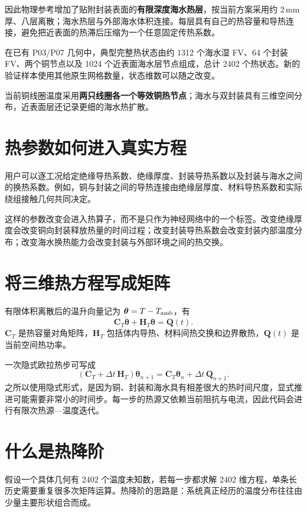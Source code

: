 因此物理参考增加了贴附封装表面的\textbf{有限深度海水热层}，按当前方案采用约 2\,mm 厚、八层离散；海水热层与外部海水体积连接。每层具有自己的热容量和导热连接，避免把近表面的热滞后压缩为一个任意固定传热系数。

在已有 P03/P07 几何中，典型完整热状态由约 1312 个海水湿 FV、64 个封装 FV、两个铜节点以及 1024 个近表面海水层节点组成，总计 2402 个热状态。新的验证样本使用其他原生网格数量，状态维数可以随之改变。

当前铜线圈温度采用\textbf{两只线圈各一个等效铜热节点}；海水与双封装具有三维空间分布，近表面层还记录更细的海水热扩散。

\section{热参数如何进入真实方程}
用户可以逐工况给定绝缘导热系数、绝缘厚度、封装导热系数以及封装与海水之间的换热系数。例如，铜与封装之间的导热连接由绝缘层厚度、材料导热系数和实际绕组接触几何共同决定。

这样的参数改变会进入热算子，而不是只作为神经网络中的一个标签。改变绝缘厚度会改变铜向封装释放热量的时间过程；改变封装导热系数会改变封装内部温度分布；改变海水换热能力会改变封装与外部环境之间的热交换。

\section{将三维热方程写成矩阵}
有限体积离散后的温升向量记为
$\boldsymbol\theta=T-T_{\rm amb}$，有
\begin{equation}
\label{eq:fullheat}
\mathbf C_T\dot{\boldsymbol\theta}
+\mathbf H_T\boldsymbol\theta
=\mathbf Q(t).
\end{equation}
$\mathbf C_T$ 是热容量对角矩阵，$\mathbf H_T$ 包括体内导热、材料间热交换和边界散热，$\mathbf Q(t)$ 是当前空间热功率。

一次隐式欧拉热步可写成
\begin{equation}
\label{eq:implicit}
(\mathbf C_T+\Delta t\,\mathbf H_T)
\boldsymbol\theta_{n+1}
=\mathbf C_T\boldsymbol\theta_n+\Delta t\,\mathbf Q_{n+1}.
\end{equation}
之所以使用隐式形式，是因为铜、封装和海水具有相差很大的热时间尺度，显式推进可能需要非常小的时间步。每一步的热源又依赖当前阻抗与电流，因此代码会进行有限次热源—温度迭代。

\section{什么是热降阶}
假设一个具体几何有 2402 个温度未知数，若每一步都求解 2402 维方程，单条长历史需要重复很多次矩阵运算。热降阶的思路是：系统真正经历的温度分布往往由少量主要形状组合而成。


